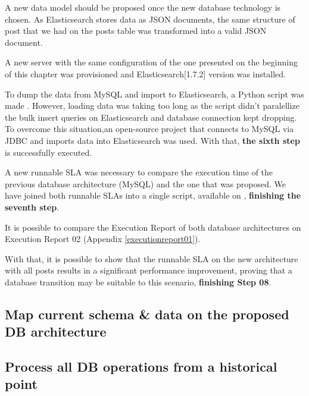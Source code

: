A new data model should be proposed once the new database technology is chosen. As Elasticsearch stores data as JSON documents, the same structure of post that we had on the posts table was transformed into a valid JSON document.

A new server with the same configuration of the one presented on the beginning of this chapter was provisioned and Elasticsearch[1.7.2] version was installed.

To dump the data from MySQL and import to Elasticsearch, a Python script was made \cite{mysqltoes}. However, loading data was taking too long as the script didn't paralellize the bulk insert queries on Elasticsearch and database connection kept dropping. To overcome this situation,an open-source project that connects to MySQL via JDBC and imports data into Elasticsearch \cite{elasticjdbc} was used. 
With that, \textbf{the sixth step} is successfully executed. 

A new runnable SLA was necessary to compare the execution time of the previous database architecture (MySQL) and the one that was proposed. We have joined both runnable SLAs into a single script, available on \cite{runnablesla01}, \textbf{finishing the seventh step}.

It is possible to compare the Execution Report of both database architectures on Execution Report 02 (Appendix \ref{executionreport01}).

With that, it is possible to show that the runnable SLA on the new architecture with all posts results in a significant performance improvement, proving that a database transition may be suitable to this scenario, \textbf{finishing Step 08}.


\subsection{Map current schema \& data on the proposed DB architecture}

\subsection{Process all DB operations from a historical point}








